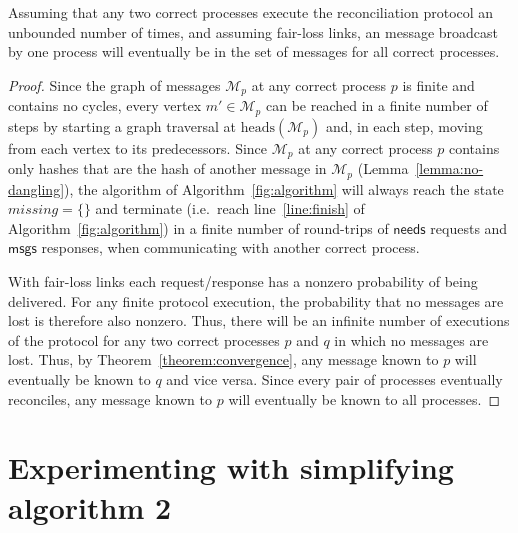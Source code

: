 \documentclass[a4paper,anonymous,USenglish]{lipics-v2019}
\begin{document}
\begin{theorem}\label{theorem:liveness}
Assuming that any two correct processes execute the reconciliation protocol an unbounded number of times, and assuming fair-loss links, an message broadcast by one process will eventually be in the set of messages for all correct processes.
\end{theorem}
\begin{proof}
Since the graph of messages $\mathcal{M}_p$ at any correct process $p$ is finite and contains no cycles, every vertex $m' \in \mathcal{M}_p$ can be reached in a finite number of steps by starting a graph traversal at $\mathrm{heads}(\mathcal{M}_p)$ and, in each step, moving from each vertex to its predecessors.
Since $\mathcal{M}_p$ at any correct process $p$ contains only hashes that are the hash of another message in $\mathcal{M}_p$ (Lemma~\ref{lemma:no-dangling}), the algorithm of Algorithm~\ref{fig:algorithm} will always reach the state $\mathit{missing} = \{\}$ and terminate (i.e.\ reach line~\ref{line:finish} of Algorithm~\ref{fig:algorithm}) in a finite number of round-trips of $\mathsf{needs}$ requests and $\mathsf{msgs}$ responses, when communicating with another correct process.

With fair-loss links each request/response has a nonzero probability of being delivered.
For any finite protocol execution, the probability that no messages are lost is therefore also nonzero.
Thus, there will be an infinite number of executions of the protocol for any two correct processes $p$ and $q$ in which no messages are lost.
Thus, by Theorem~\ref{theorem:convergence}, any message known to $p$ will eventually be known to $q$ and vice versa.
Since every pair of processes eventually reconciles, any message known to $p$ will eventually be known to all processes.
\end{proof}

\section{Experimenting with simplifying algorithm 2}
\end{document}
